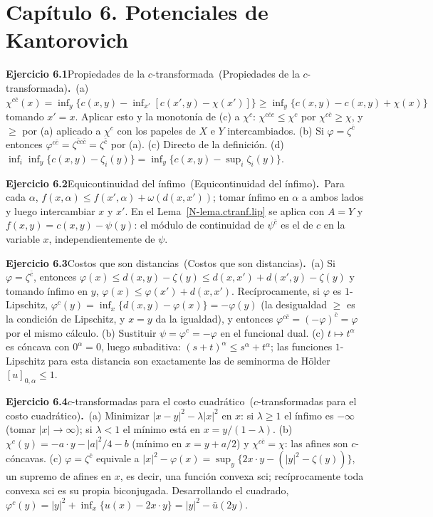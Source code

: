 \documentclass[11pt,a4paper]{amsart}
\theoremstyle{remark}
\theoremstyle{definition}
\numberwithin{subsection}{section}
\numberwithin{equation}{section}
\newcommand{\ejlabel}[2]{\par\medskip\noindent\textbf{Ejercicio #1}\ifx\relax#2\relax\else\ (#2)\fi\textbf{.}\ }
\begin{document}
\section*{Capítulo 6. Potenciales de Kantorovich}
\ejlabel{6.1}{Propiedades de la $c$-transformada}(a) $\chi^{c\bar c}(x)=\inf_y\{c(x,y)-\inf_{x'}[c(x',y)-\chi(x')]\}\ge\inf_y\{c(x,y)-c(x,y)+\chi(x)\}$ tomando $x'=x$. Aplicar esto y la monotonía de (c) a $\chi^c$: $\chi^{c\bar cc}\le\chi^c$ por $\chi^{c\bar c}\ge\chi$, y $\ge$ por (a) aplicado a $\chi^c$ con los papeles de $X$ e $Y$ intercambiados. (b) Si $\varphi=\zeta^{\bar c}$ entonces $\varphi^{c\bar c}=\zeta^{\bar cc\bar c}=\zeta^{\bar c}$ por (a). (c) Directo de la definición. (d) $\inf_i\inf_y\{c(x,y)-\zeta_i(y)\}=\inf_y\{c(x,y)-\sup_i\zeta_i(y)\}$.

\ejlabel{6.2}{Equicontinuidad del ínfimo}Para cada $\alpha$, $f(x,\alpha)\le f(x',\alpha)+\omega(d(x,x'))$; tomar ínfimo en $\alpha$ a ambos lados y luego intercambiar $x$ y $x'$. En el Lema~\ref{N-lema.ctranf.lip} se aplica con $A=Y$ y $f(x,y)=c(x,y)-\psi(y)$: el módulo de continuidad de $\psi^{\bar c}$ es el de $c$ en la variable $x$, independientemente de $\psi$.

\ejlabel{6.3}{Costos que son distancias}(a) Si $\varphi=\zeta^{\bar c}$, entonces $\varphi(x)\le d(x,y)-\zeta(y)\le d(x,x')+d(x',y)-\zeta(y)$ y tomando ínfimo en $y$, $\varphi(x)\le\varphi(x')+d(x,x')$. Recíprocamente, si $\varphi$ es $1$-Lipschitz, $\varphi^c(y)=\inf_x\{d(x,y)-\varphi(x)\}=-\varphi(y)$ (la desigualdad $\ge$ es la condición de Lipschitz, y $x=y$ da la igualdad), y entonces $\varphi^{c\bar c}=(-\varphi)^{\bar c}=\varphi$ por el mismo cálculo. (b) Sustituir $\psi=\varphi^c=-\varphi$ en el funcional dual. (c) $t\mapsto t^\alpha$ es cóncava con $0^\alpha=0$, luego subaditiva: $(s+t)^\alpha\le s^\alpha+t^\alpha$; las funciones $1$-Lipschitz para esta distancia son exactamente las de seminorma de Hölder $[u]_{0,\alpha}\le1$.

\ejlabel{6.4}{$c$-transformadas para el costo cuadrático}(a) Minimizar $|x-y|^2-\lambda|x|^2$ en $x$: si $\lambda\ge1$ el ínfimo es $-\infty$ (tomar $|x|\to\infty$); si $\lambda<1$ el mínimo está en $x=y/(1-\lambda)$. (b) $\chi^c(y)=-a\cdot y-|a|^2/4-b$ (mínimo en $x=y+a/2$) y $\chi^{c\bar c}=\chi$: las afines son $c$-cóncavas. (c) $\varphi=\zeta^{\bar c}$ equivale a $|x|^2-\varphi(x)=\sup_y\{2x\cdot y-(|y|^2-\zeta(y))\}$, un supremo de afines en $x$, es decir, una función convexa sci; recíprocamente toda convexa sci es su propia biconjugada. Desarrollando el cuadrado, $\varphi^c(y)=|y|^2+\inf_x\{u(x)-2x\cdot y\}=|y|^2-\bar u(2y)$.
\end{document}
